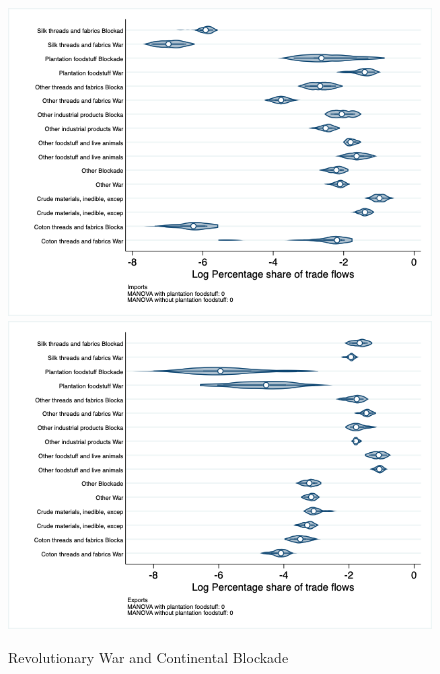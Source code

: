 \documentclass[12pt,a4paper,notitlepage,english]{article}
\begin{document}
\begin{figure}
\centering
\caption{Revolutionary War and Continental Blockade}
\label{rev_block_nat_distr_aggr}
\includegraphics[scale=.4]{rev_block_nat_distr_Iaggr}
\includegraphics[scale=.4]{rev_block_nat_distr_Xaggr}
\end{figure}
\end{document}
